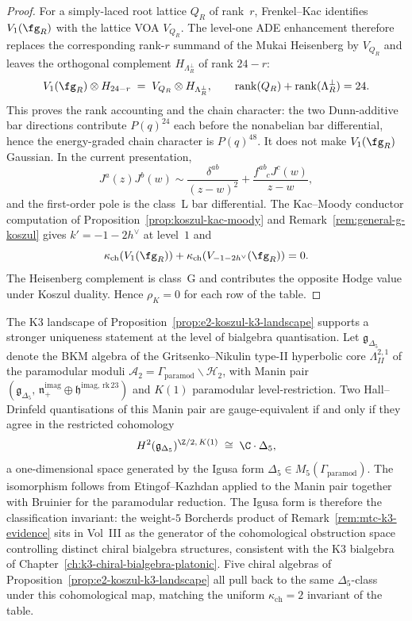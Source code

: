 \begin{proof}
For a simply-laced root lattice $Q_R$ of rank~$r$, Frenkel--Kac identifies
$V_1(\fg_R)$ with the lattice VOA $V_{Q_R}$. The level-one ADE enhancement
therefore replaces the corresponding rank-$r$ summand of the Mukai
Heisenberg by $V_{Q_R}$ and leaves the orthogonal complement
$H_{\Lambda_R^\perp}$ of rank $24-r$:
\[
 V_1(\fg_R)\otimes H_{24-r}
 \;=\; V_{Q_R}\otimes H_{\Lambda_R^\perp},
 \qquad
 \mathrm{rank}(Q_R)+\mathrm{rank}(\Lambda_R^\perp)=24 .
\]
This proves the rank accounting and the chain character: the two
Dunn-additive bar directions contribute $P(q)^{24}$ each before the
nonabelian bar differential, hence the energy-graded chain character is
$P(q)^{48}$. It does not make $V_1(\fg_R)$ Gaussian. In the current
presentation,
\[
 J^a(z)J^b(w)\sim
 \frac{\delta^{ab}}{(z-w)^2}
 + \frac{f^{ab}_{\phantom{ab}c}J^c(w)}{z-w},
\]
and the first-order pole is the class~L bar differential. The
Kac--Moody conductor computation of
Proposition~\ref{prop:koszul-kac-moody} and
Remark~\ref{rem:general-g-koszul} gives
$k'=-1-2h^\vee$ at level~$1$ and
\[
 \kappa_{\mathrm{ch}}(V_1(\fg_R))
 +\kappa_{\mathrm{ch}}(V_{-1-2h^\vee}(\fg_R))=0.
\]
The Heisenberg complement is class~G and contributes the opposite
Hodge value under Koszul duality. Hence
$\rho_K=0$ for each row of the table.
\end{proof}

\begin{remark}
\label{rem:e2-H2-one-dimensional}
The K3 landscape of Proposition~\ref{prop:e2-koszul-k3-landscape} supports
a stronger uniqueness statement at the level of bialgebra quantisation.
Let $\mathfrak{g}_{\Delta_5}$ denote the BKM algebra of the
Gritsenko--Nikulin type-II hyperbolic core $\Lambda^{2,1}_{II}$ of the paramodular
moduli $\mathcal{A}_2 = \Gamma_{\mathrm{paramod}} \backslash
\mathcal{H}_2$, with Manin pair
$(\mathfrak{g}_{\Delta_5},\,
\mathfrak{n}_{+}^{\mathrm{imag}} \oplus \mathfrak{h}^{\mathrm{imag,\,rk\,23}})$
and $K(1)$ paramodular level-restriction. Two Hall--Drinfeld
quantisations of this Manin pair are gauge-equivalent if and only if they
agree in the restricted cohomology
\[
 H^{2}(\mathfrak{g}_{\Delta_5})^{\Z/2,\,K(1)}
 \;\cong\; \C \cdot \Delta_{5},
\]
a one-dimensional space generated by the Igusa form
$\Delta_5 \in M_5(\Gamma_{\mathrm{paramod}})$. The isomorphism follows from
Etingof--Kazhdan \cite{EtingofKazhdan2008} applied to the Manin pair
together with Bruinier \cite[Prop.~5.1]{Bruinier2002} for the paramodular
reduction. The Igusa form is therefore the classification
invariant: the weight-$5$ Borcherds product of
Remark~\ref{rem:mtc-k3-evidence} sits in Vol~III as the generator of the
cohomological obstruction space controlling distinct chiral bialgebra
structures, consistent with the K3 bialgebra of
Chapter~\ref{ch:k3-chiral-bialgebra-platonic}. Five chiral algebras of
Proposition~\ref{prop:e2-koszul-k3-landscape} all pull back to the same
$\Delta_{5}$-class under this cohomological map, matching the uniform
$\kappa_{\mathrm{ch}} = 2$ invariant of the table.
\end{remark}

